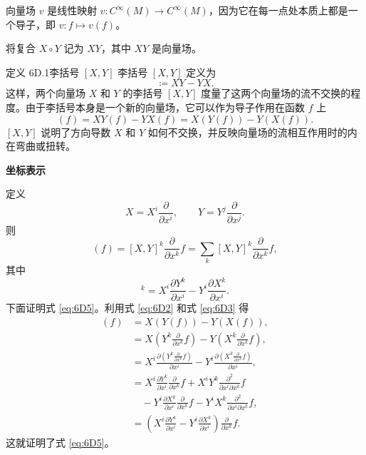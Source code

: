 向量场 $v$ 是线性映射 $v\colon C^\infty(M)\to C^\infty(M)$，因为它在每一点处本质上都是一个导子，即 $v\colon f\mapsto v(f)$。

将复合 $X\circ Y$ 记为 $XY$，其中 $XY$ 是向量场。%

\begin{statement}{定义 6D.1}{李括号 $[X,Y]$}
李括号 $[X,Y]$ 定义为
\begin{equation*}
  [X,Y]\coloneqq XY-YX.
  \tag{6D1}\label{eq:6D1}
\end{equation*}
这样，两个向量场 $X$ 和 $Y$ 的李括号 $[X,Y]$ 度量了这两个向量场的流不交换的程度。由于李括号本身是一个新的向量场，它可以作为导子作用在函数 $f$ 上
\begin{equation*}
  [X,Y](f)=XY(f)-YX(f)=X(Y(f))-Y(X(f)).
  \tag{6D2}\label{eq:6D2}
\end{equation*}
$[X,Y]$ 说明了方向导数 $X$ 和 $Y$ 如何不交换，并反映向量场的流相互作用时的内在弯曲或扭转。%

\noindent\textbf{坐标表示}\par
定义
\begin{equation*}
  X=X^i\frac{\partial}{\partial x^i},\qquad
  Y=Y^j\frac{\partial}{\partial x^j}.
  \tag{6D3}\label{eq:6D3}
\end{equation*}
则
\begin{equation*}
  [X,Y](f)=[X,Y]^k\frac{\partial}{\partial x^k}f
     =\sum_k[X,Y]^k\frac{\partial}{\partial x^k}f,
  \tag{6D4}\label{eq:6D4}
\end{equation*}
其中
\begin{equation*}
  [X,Y]^k=X^i\frac{\partial Y^k}{\partial x^i}
         -Y^i\frac{\partial X^k}{\partial x^i}.
  \tag{6D5}\label{eq:6D5}
\end{equation*}
下面证明式 \eqref{eq:6D5}。利用式 \eqref{eq:6D2} 和式 \eqref{eq:6D3} 得
\begin{align*}
 [X,Y](f)
   &=X(Y(f))-Y(X(f)),\\
   &=X\!\left(Y^k\frac{\partial}{\partial x^k}f\right)
     -Y\!\left(X^k\frac{\partial}{\partial x^k}f\right),\\
   &=X^i\frac{\partial\left(Y^k\frac{\partial}{\partial x^k}f\right)}{\partial x^i}
     -Y^i\frac{\partial\left(X^k\frac{\partial}{\partial x^k}f\right)}{\partial x^i},\\
   &=X^i\frac{\partial Y^k}{\partial x^i}\frac{\partial}{\partial x^k}f
     +X^iY^k\frac{\partial^2}{\partial x^i\partial x^k}f\\
   &\quad-Y^i\frac{\partial X^k}{\partial x^i}\frac{\partial}{\partial x^k}f
     -Y^iX^k\frac{\partial^2}{\partial x^i\partial x^k}f,\\
   &=\left(X^i\frac{\partial Y^k}{\partial x^i}
      -Y^i\frac{\partial X^k}{\partial x^i}\right)\frac{\partial}{\partial x^k}f.
\end{align*}
这就证明了式 \eqref{eq:6D5}。
\end{statement}

